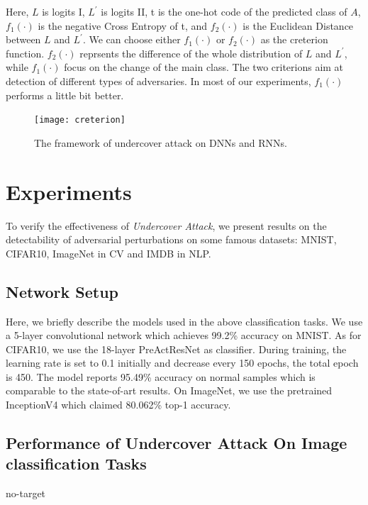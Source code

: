 \documentclass{article}
\begin{document}
Here, $L$ is logits I, $L^{'}$ is logits II, t is the one-hot code of the predicted class of $A$, $f_1(\cdot)$ is the negative Cross Entropy of t, and $f_2(\cdot)$ is the Euclidean Distance between $L$ and $L^{'}$. We can choose either $f_1(\cdot)$ or $f_2(\cdot)$ as the creterion function. $f_2(\cdot)$ reprsents the difference of the whole distribution of $L$ and $L^{'}$, while $f_1(\cdot)$ focus on the change of the main class. The two criterions aim at detection of different types of adversaries. In most of our experiments, $f_1(\cdot)$ performs a little bit better.

\begin{figure}[ht]
  \centerline{\texttt{[image: creterion]}}
  \caption{The framework of undercover attack on DNNs and RNNs.}
  \label{creterion}
\end{figure}

\section{Experiments}
 
To verify the effectiveness of \emph{Undercover Attack}, we present results on the detectability of adversarial perturbations on some famous datasets: MNIST, CIFAR10, ImageNet in CV and IMDB in NLP. 

\subsection{Network Setup}
Here, we briefly describe the models used in the above classification tasks. We use a 5-layer convolutional network which achieves 99.2\% accuracy on MNIST. As for CIFAR10, we use the 18-layer PreActResNet \cite{he2016identity} as classifier. During training, the learning rate is set to 0.1 initially and decrease every 150 epochs, the total epoch is 450. The model reports 95.49\% accuracy on normal samples which is comparable to the state-of-art results. On ImageNet, we use the pretrained InceptionV4 \cite{Szegedy2016Inception} which claimed 80.062\% top-1 accuracy. 

\subsection{Performance of Undercover Attack On Image classification Tasks}

no-target
\end{document}
